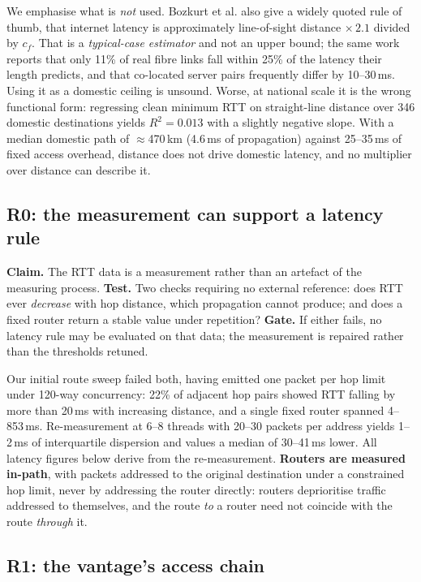We emphasise what is \emph{not} used. Bozkurt et al. also give a widely quoted rule of
thumb, that internet latency is approximately line-of-sight distance $\times\,2.1$ divided
by $c_f$. That is a \emph{typical-case estimator} and not an upper bound; the same work
reports that only 11\% of real fibre links fall within 25\% of the latency their length
predicts, and that co-located server pairs frequently differ by 10--30\,ms. Using it as a
domestic ceiling is unsound. Worse, at national scale it is the wrong functional form:
regressing clean minimum RTT on straight-line distance over 346 domestic destinations
yields $R^2 = 0.013$ with a slightly negative slope. With a median domestic path of
$\approx$470\,km (4.6\,ms of propagation) against 25--35\,ms of fixed access overhead,
distance does not drive domestic latency, and no multiplier over distance can describe it.

\subsection{R0: the measurement can support a latency rule}

\textbf{Claim.} The RTT data is a measurement rather than an artefact of the measuring
process. \textbf{Test.} Two checks requiring no external reference: does RTT ever
\emph{decrease} with hop distance, which propagation cannot produce; and does a fixed
router return a stable value under repetition? \textbf{Gate.} If either fails, no latency
rule may be evaluated on that data; the measurement is repaired rather than the thresholds
retuned.

Our initial route sweep failed both, having emitted one packet per hop limit under 120-way
concurrency: 22\% of adjacent hop pairs showed RTT falling by more than 20\,ms with
increasing distance, and a single fixed router spanned 4--853\,ms. Re-measurement at 6--8
threads with 20--30 packets per address yields 1--2\,ms of interquartile dispersion and
values a median of 30--41\,ms lower. All latency figures below derive from the
re-measurement. \textbf{Routers are measured in-path}, with packets addressed to the
original destination under a constrained hop limit, never by addressing the router
directly: routers deprioritise traffic addressed to themselves, and the route \emph{to} a
router need not coincide with the route \emph{through} it.

\subsection{R1: the vantage's access chain}

